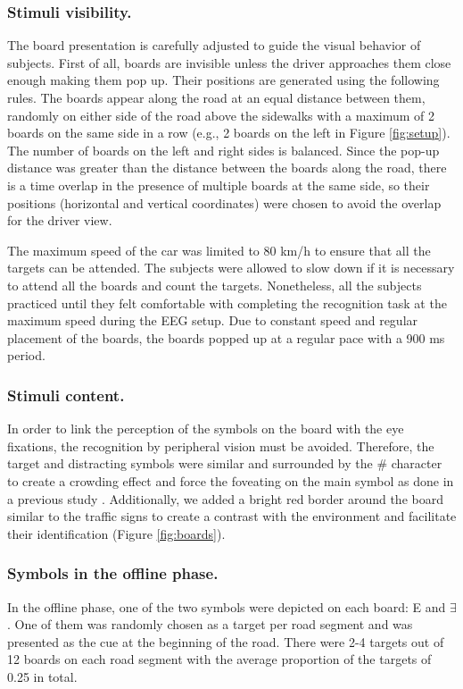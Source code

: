 \documentclass[12pt]{iopart}
\begin{document}
\subsubsection{Stimuli visibility.}
The board presentation is carefully adjusted to guide the visual behavior of subjects.
First of all, boards are invisible unless the driver approaches them
close enough making them pop up.
Their positions are generated using the following rules.
The boards appear along the road at an equal distance between them, 
randomly on either side of the road above the sidewalks
with a maximum of 2 boards
on the same side in a row  (e.g., 2 boards on the left in Figure \ref{fig:setup}). The number of boards on the left
and right sides is balanced. Since the pop-up distance was greater than the distance between the boards along the road, there is a time overlap in the presence of multiple boards at the same side, so their positions (horizontal and vertical coordinates) were chosen to avoid the overlap for the driver view.

The maximum speed of the car was limited to 80 km/h to ensure 
that all the targets
can be attended. The subjects were allowed to slow down if it is necessary
to attend all the boards and count the targets.
Nonetheless, all the subjects practiced until they felt comfortable 
with completing the recognition task at the maximum speed
during the EEG setup.
Due to constant speed and regular placement of the boards, the boards
popped up at a regular pace with a 900 ms period.

\subsubsection{Stimuli content.} In order to link the perception of the symbols on the board
with the eye fixations, the recognition by
peripheral vision must be avoided. Therefore, the target and distracting
symbols were similar and surrounded by the \# character to create
a crowding effect and force the foveating on the main symbol
as done in a previous study \cite{kamienkowski_fixation-related_2012}.
Additionally, we added a bright red border around the board similar 
to the traffic signs
to create a contrast with the environment and facilitate
their identification (Figure \ref{fig:boards}).

\subsubsection*{Symbols in the offline phase.}
In the offline phase, one of the two symbols were depicted on each board:
E and $\exists$.
One of them was randomly chosen as a target per road segment
and was presented as the cue
at the beginning of the road. There were 2-4 targets out of 12 boards
on each road segment with the average proportion of the targets of 0.25 in total.
\end{document}
